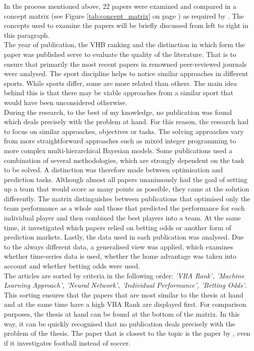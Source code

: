 In the process mentioned above, 22 papers were examined and compared in a concept matrix (see Figure \ref{tab:concept_matrix} on page \pageref{tab:concept_matrix}) as required by \citet{webster_guest_2002}. The concepts used to examine the papers will be briefly discussed from left to right in this paragraph. \\
\indent The year of publication, the VHB ranking and the distinction in which form the paper was published serve to evaluate the quality of the literature. That is to ensure that primarily the most recent papers in renowned peer-reviewed journals were analysed. The sport discipline helps to notice similar approaches in different sports. While sports differ, some are more related than others. The main idea behind this is that there may be viable approaches from a similar sport that would have been unconsidered otherwise.  \\
\indent During the research, to the best of my knowledge, no publication was found which deals precisely with the problem at hand. For this reason, the research had to focus on similar approaches, objectives or tasks. The solving approaches vary from more straightforward approaches such as mixed integer programming to more complex multi-hierarchical Bayesian models. Some publications used a combination of several methodologies, which are strongly dependent on the task to be solved. A distinction was therefore made between optimisation and prediction tasks. Although almost all papers unanimously had the goal of setting up a team that would score as many points as possible, they came at the solution differently. The matrix distinguishes between publications that optimised only the team performance as a whole and those that predicted the performance for each individual player and then combined the best players into a team. At the same time, it investigated which papers relied on betting odds or another form of prediction markets. Lastly, the data used in each publication was analysed. Due to the always different data, a generalised view was applied, which examines whether time-series data is used, whether the home advantage was taken into account and whether betting odds were used. \\
\indent The articles are sorted by criteria in the following order: \emph{'VBA Rank', 'Machine Learning Approach', 'Neural Network', 'Individual Performance', 'Betting Odds'}. This sorting ensures that the papers that are most similar to the thesis at hand and at the same time have a high VBA Rank are displayed first. For comparison purposes, the thesis at hand can be found at the bottom of the matrix. In this way, it can be quickly recognised that no publication deals precisely with the problem of the thesis. The paper that is closest to the topic is the paper by \citet{landers_machine_2017}, even if it investigates football instead of soccer.

